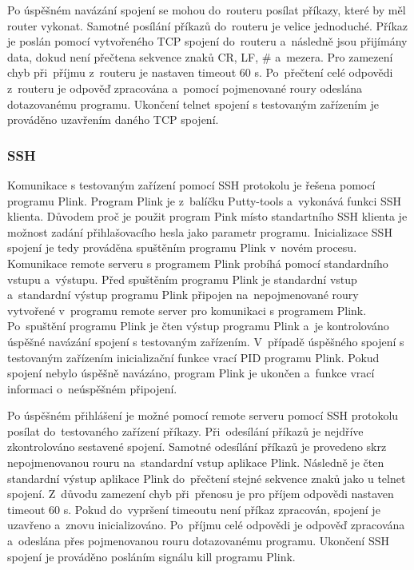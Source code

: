 Po úspěšném navázání spojení se mohou do~routeru posílat příkazy, které by měl router vykonat. Samotné posílání příkazů do~routeru je velice jednoduché. Příkaz je poslán pomocí vytvořeného TCP spojení do~routeru a~následně jsou přijímány data, dokud není přečtena sekvence znaků CR, LF, \# a~mezera. Pro zamezení chyb při~příjmu z~routeru je nastaven timeout 60 s. Po~přečtení celé odpovědi z~routeru je odpověď zpracována a~pomocí pojmenované roury odeslána dotazovanému programu. Ukončení telnet spojení s testovaným zařízením je prováděno uzavřením daného TCP spojení.

\subsubsection{SSH}
Komunikace s testovaným zařízení pomocí SSH protokolu je řešena pomocí programu Plink. Program Plink je z~balíčku Putty-tools a~vykonává funkci SSH klienta. Důvodem proč je použit program Pink místo standartního SSH klienta je možnost zadání přihlašovacího hesla jako parametr programu. Inicializace SSH spojení je tedy prováděna spuštěním programu Plink v~novém procesu. Komunikace remote serveru s programem Plink probíhá pomocí standardního vstupu a~výstupu. Před spuštěním programu Plink je standardní vstup a~standardní výstup programu Plink připojen na~nepojmenované roury vytvořené v~programu remote server pro komunikaci s programem Plink. Po~spuštění programu Plink je čten výstup programu Plink a~je kontrolováno úspěšné navázání spojení s testovaným zařízením. V~případě úspěšného spojení s testovaným zařízením inicializační funkce vrací PID programu Plink. Pokud spojení nebylo úspěšně navázáno, program Plink je ukončen a~funkce vrací informaci o~neúspěšném připojení.

Po úspěšném přihlášení je možné pomocí remote serveru pomocí SSH protokolu posílat do~testovaného zařízení příkazy. Při~odesílání příkazů je nejdříve zkontrolováno sestavené spojení. Samotné odesílání příkazů je provedeno skrz nepojmenovanou rouru na~standardní vstup aplikace Plink. Následně je čten standardní výstup aplikace Plink do~přečtení stejné sekvence znaků jako u telnet spojení. Z~důvodu zamezení chyb při~přenosu je pro příjem odpovědi nastaven timeout 60 s. Pokud do~vypršení timeoutu není příkaz zpracován, spojení je uzavřeno a~znovu inicializováno. Po~příjmu celé odpovědi je odpověď zpracována a~odeslána přes pojmenovanou rouru dotazovanému programu. Ukončení SSH spojení je prováděno posláním signálu kill programu Plink.

